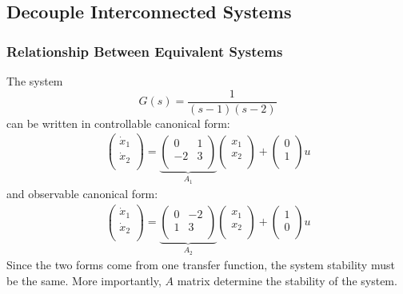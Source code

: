 \documentclass[12pt,a4paper]{article}
\begin{document}
\subsection{Decouple Interconnected Systems}
\subsubsection{Relationship Between Equivalent Systems}
The system \[G(s)=\frac{1}{(s-1)(s-2)}\] can be written in
controllable canonical form:
\begin{gather*}
\begin{pmatrix}
\dot{x}_{1}\\
\dot{x}_{2}\\
\end{pmatrix}
= \underbrace{\begin{pmatrix}
0 & 1\\
-2 &3 \\
\end{pmatrix}}_{A_{1}}
\begin{pmatrix}
x_{1}\\
x_{2}\\
\end{pmatrix}
+\begin{pmatrix}
0\\
1\\
\end{pmatrix} u
\end{gather*}
and observable canonical form:
\begin{gather*}
\begin{pmatrix}
\dot{x}_{1}\\
\dot{x}_{2}\\
\end{pmatrix}
= \underbrace{\begin{pmatrix}
0 & -2\\
1 &3 \\
\end{pmatrix}}_{A_{2}}
\begin{pmatrix}
x_{1}\\
x_{2}\\
\end{pmatrix}
+\begin{pmatrix}
1\\
0\\
\end{pmatrix}
u
\end{gather*}
Since the two forms come from one transfer function, the system stability must be the same.
More importantly, $A$ matrix determine the stability of the system.\\\\
\end{document}
